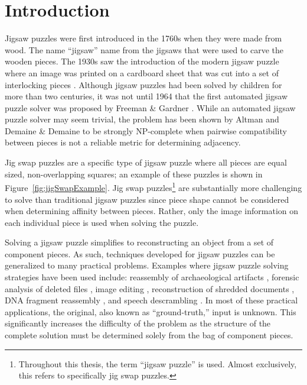 \chapter{Introduction}\label{sec:introduction}

Jigsaw puzzles were first introduced in the 1760s when they were made from wood.  The name ``jigsaw'' name from the jigsaws that were used to carve the wooden pieces.   The 1930s saw the introduction of the modern jigsaw puzzle where an image was printed on a cardboard sheet that was cut into a set of interlocking pieces \cite{williams1990, williams2004}.  Although jigsaw puzzles had been solved by children for more than two centuries, it was not until 1964 that the first automated jigsaw puzzle solver was proposed by Freeman \& Gardner \cite{freeman1964}.  While an automated jigsaw puzzle solver may seem trivial, the problem has been shown by Altman \cite{altman1990} and Demaine \& Demaine \cite{demaine2007} to be strongly NP-complete when pairwise compatibility between pieces is not a reliable metric for determining adjacency.

Jig swap puzzles are a specific type of jigsaw puzzle where all pieces are equal sized, non-overlapping squares; an example of these puzzles is shown in Figure~\ref{fig:jigSwapExample}.  Jig swap puzzles\footnote{Throughout this thesis, the term ``jigsaw puzzle''  is used. Almost exclusively, this refers to specifically jig swap puzzles.} are substantially more challenging to solve than traditional jigsaw puzzles since piece shape cannot be considered when determining affinity between pieces.  Rather, only the image information on each individual piece is used when solving the puzzle.

Solving a jigsaw puzzle simplifies to reconstructing an object from a set of component pieces.  As such, techniques developed for jigsaw puzzles can be generalized to many practical problems.  Examples where jigsaw puzzle solving strategies have been used include: reassembly of archaeological artifacts \cite{brown2008, koller2006}, forensic analysis of deleted files \cite{garfinkel2010}, image editing \cite{cho2008}, reconstruction of shredded documents \cite{zhu2008}, DNA fragment reassembly \cite{marande2007}, and speech descrambling \cite{zhao2007}.  In most of these practical applications, the original, also known as ``ground-truth,'' input is unknown.  This significantly increases the difficulty of the problem as the structure of the complete solution must be determined solely from the bag of component pieces.

